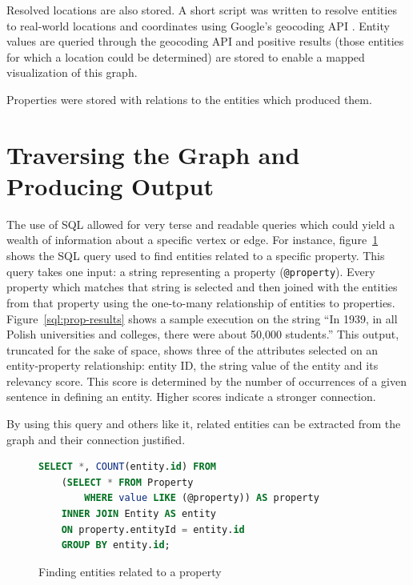 Resolved locations are also stored.  A short script was written to resolve entities to real-world locations and coordinates using Google's geocoding API \cite{geocode}.  Entity values are queried through the geocoding API and positive results (those entities for which a location could be determined) are stored to enable a mapped visualization of this graph.

Properties were stored with relations to the entities which produced them.   %


\section{Traversing the Graph and Producing Output}

The use of SQL allowed for very terse and readable queries which could yield a wealth of information about a specific vertex or edge.  For instance, figure~\ref{sql:prop} shows the SQL query used to find entities related to a specific property.  This query takes one input: a string representing a property (\verb|@property|).  Every property which matches that string is selected and then joined with the entities from that property using the one-to-many relationship of entities to properties.  Figure~\ref{sql:prop-results} shows a sample execution on the string ``In 1939, in all Polish universities and colleges, there were about 50,000 students.''  This output, truncated for the sake of space, shows three of the attributes selected on an entity-property relationship: entity ID, the string value of the entity and its relevancy score.  This score is determined by the number of occurrences of a given sentence in defining an entity.  Higher scores indicate a stronger connection.

By using this query and others like it, related entities can be extracted from the graph and their connection justified.  

\begin{figure}
\begin{lstlisting}[language=sql,style=mystyle]
SELECT *, COUNT(entity.id) FROM 
	(SELECT * FROM Property
		WHERE value LIKE (@property)) AS property
    INNER JOIN Entity AS entity
    ON property.entityId = entity.id
    GROUP BY entity.id;
\end{lstlisting}
\caption{Finding entities related to a property}
\label{sql:prop}
\end{figure}


